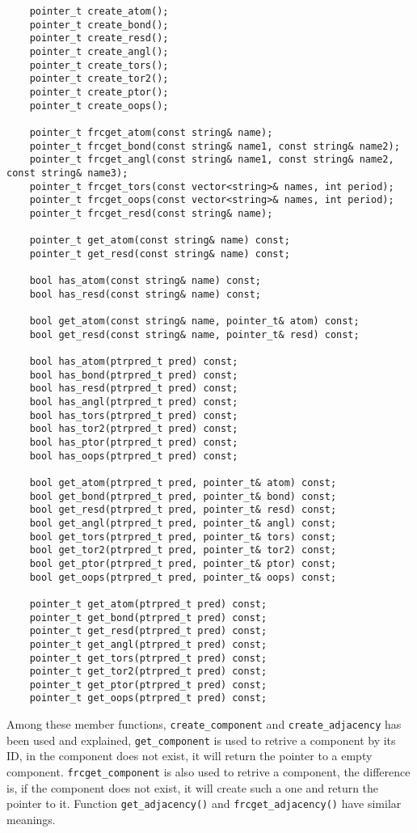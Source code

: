 \documentclass[letterpaper]{book}
\begin{document}
\begin{lstlisting}
    pointer_t create_atom();
    pointer_t create_bond();
    pointer_t create_resd();
    pointer_t create_angl();
    pointer_t create_tors();
    pointer_t create_tor2();
    pointer_t create_ptor();
    pointer_t create_oops();

    pointer_t frcget_atom(const string& name);
    pointer_t frcget_bond(const string& name1, const string& name2);
    pointer_t frcget_angl(const string& name1, const string& name2, const string& name3);
    pointer_t frcget_tors(const vector<string>& names, int period);
    pointer_t frcget_oops(const vector<string>& names, int period);
    pointer_t frcget_resd(const string& name);

    pointer_t get_atom(const string& name) const;
    pointer_t get_resd(const string& name) const;

    bool has_atom(const string& name) const;
    bool has_resd(const string& name) const;

    bool get_atom(const string& name, pointer_t& atom) const;
    bool get_resd(const string& name, pointer_t& resd) const;

    bool has_atom(ptrpred_t pred) const;
    bool has_bond(ptrpred_t pred) const;
    bool has_resd(ptrpred_t pred) const;
    bool has_angl(ptrpred_t pred) const;
    bool has_tors(ptrpred_t pred) const;
    bool has_tor2(ptrpred_t pred) const;
    bool has_ptor(ptrpred_t pred) const;
    bool has_oops(ptrpred_t pred) const;

    bool get_atom(ptrpred_t pred, pointer_t& atom) const;
    bool get_bond(ptrpred_t pred, pointer_t& bond) const;
    bool get_resd(ptrpred_t pred, pointer_t& resd) const;
    bool get_angl(ptrpred_t pred, pointer_t& angl) const;
    bool get_tors(ptrpred_t pred, pointer_t& tors) const;
    bool get_tor2(ptrpred_t pred, pointer_t& tor2) const;
    bool get_ptor(ptrpred_t pred, pointer_t& ptor) const;
    bool get_oops(ptrpred_t pred, pointer_t& oops) const;

    pointer_t get_atom(ptrpred_t pred) const;
    pointer_t get_bond(ptrpred_t pred) const;
    pointer_t get_resd(ptrpred_t pred) const;
    pointer_t get_angl(ptrpred_t pred) const;
    pointer_t get_tors(ptrpred_t pred) const;
    pointer_t get_tor2(ptrpred_t pred) const;
    pointer_t get_ptor(ptrpred_t pred) const;
    pointer_t get_oops(ptrpred_t pred) const;

\end{lstlisting}

Among these member functions, \lstinline$create_component$ and \lstinline$create_adjacency$ has
been used and explained, \lstinline$get_component$ is used to retrive a component by its ID, 
in the component does not exist, it will return the pointer to a empty component. 
\lstinline$frcget_component$ is also used to retrive a component, the difference is, if the
component does not exist, it will create such a one and return the pointer to it. Function
\lstinline$get_adjacency()$ and \lstinline$frcget_adjacency()$ have similar meanings.
\end{document}
